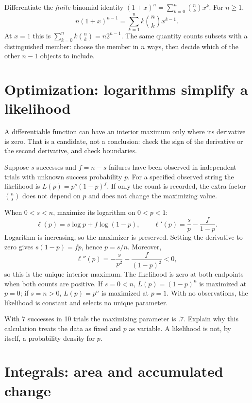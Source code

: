 \begin{example}
Differentiate the \emph{finite} binomial identity
$(1+x)^n=\sum_{k=0}^n\binom nkx^k$. For $n\ge1$,
\[
 n(1+x)^{n-1}=\sum_{k=1}^n k\binom nkx^{k-1}.
\]
At $x=1$ this is $\sum_{k=0}^n k\binom nk=n2^{n-1}$.
The same quantity counts subsets with a distinguished member: choose
the member in $n$ ways, then decide which of the other $n-1$ objects to include.
\end{example}

\section{Optimization: logarithms simplify a likelihood}

A differentiable function can have an interior maximum only where its
derivative is zero. That is a candidate, not a conclusion: check the
sign of the derivative or the second derivative, and check boundaries.

Suppose $s$ successes and $f=n-s$ failures have been observed in
independent trials with unknown success probability $p$. For a specified
observed string the likelihood is $L(p)=p^s(1-p)^f$. If only the count
is recorded, the extra factor $\binom ns$ does not depend on $p$ and
does not change the maximizing value.

When $0<s<n$, maximize its logarithm on $0<p<1$:
\[
 \ell(p)=s\log p+f\log(1-p),\qquad
 \ell'(p)=\frac{s}{p}-\frac{f}{1-p}.
\]
Logarithm is increasing, so the maximizer is preserved. Setting the
derivative to zero gives $s(1-p)=fp$, hence $p=s/n$. Moreover,
\[
 \ell''(p)=-\frac{s}{p^2}-\frac{f}{(1-p)^2}<0,
\]
so this is the unique interior maximum. The likelihood is zero at
both endpoints when both counts are positive.
If $s=0<n$, $L(p)=(1-p)^n$ is maximized at $p=0$; if $s=n>0$,
$L(p)=p^n$ is maximized at $p=1$. With no observations, the likelihood
is constant and selects no unique parameter.

\begin{checkpoint}
With 7 successes in 10 trials the maximizing parameter is $.7$.
Explain why this calculation treats the data as fixed and $p$ as
variable. A likelihood is not, by itself, a probability density for $p$.
\end{checkpoint}

\section{Integrals: area and accumulated change}
\label{sec:calc-integrals}

